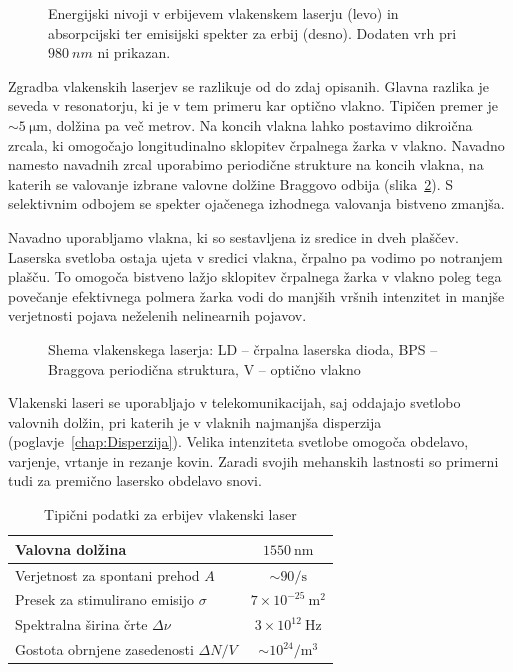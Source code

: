 \begin{figure}[h]
\centering
\def\svgwidth{130truemm} 

\caption{Energijski nivoji v erbijevem vlakenskem laserju (levo) in 
absorpcijski ter emisijski spekter za erbij (desno). Dodaten vrh pri $980~\si{nm}$ 
ni prikazan.}
\label{fig:ErFib}
\end{figure} 

Zgradba vlakenskih laserjev se razlikuje od do zdaj opisanih. Glavna razlika je
seveda v resonatorju, ki je v tem primeru kar optično vlakno. Tipičen premer je 
$\sim 5~\si{\micro\meter}$, dolžina pa več metrov. Na koncih vlakna lahko 
postavimo dikroična zrcala, ki omogočajo longitudinalno sklopitev črpalnega 
žarka v vlakno. Navadno namesto navadnih zrcal uporabimo periodične strukture 
na koncih vlakna, na katerih se valovanje izbrane valovne dolžine Braggovo odbija
(slika~\ref{fig:Fibshema}). 
S selektivnim odbojem se spekter ojačenega izhodnega valovanja bistveno zmanjša. 

Navadno uporabljamo vlakna, ki so sestavljena iz sredice in dveh plaščev. Laserska
svetloba ostaja ujeta v sredici vlakna, črpalno pa vodimo po notranjem plašču. To
omogoča bistveno lažjo sklopitev črpalnega žarka v vlakno poleg tega povečanje
efektivnega polmera žarka vodi do manjših vršnih intenzitet in manjše verjetnosti
pojava neželenih nelinearnih pojavov. 

\begin{figure}[h]
\centering
\def\svgwidth{100truemm} 

\caption{Shema vlakenskega laserja: LD -- črpalna laserska dioda, 
BPS -- Braggova periodična struktura, V -- optično vlakno
}
\label{fig:Fibshema}
\end{figure}

Vlakenski laseri se uporabljajo v telekomunikacijah, saj oddajajo svetlobo 
valovnih dolžin, pri katerih je v vlaknih najmanjša disperzija (poglavje~\ref{chap:Disperzija}). 
Velika intenziteta svetlobe omogoča obdelavo, varjenje, vrtanje in rezanje kovin. 
Zaradi svojih mehanskih lastnosti so primerni tudi za premično lasersko obdelavo snovi.

\begin{table}[!h]
\begin{center}
\begin{tabular}{|l|c|}\hline
Valovna dolžina  & $1550~\si{\nano\meter}$\\ \hline
Verjetnost za spontani prehod $A$ & $ \sim 90/\si{\second}$ \\ \hline
Presek za stimulirano emisijo $\sigma$ & $7 \times 10^{-25}~\si{\metre}^2$ \\ \hline
Spektralna širina črte $\Delta \nu$ & $3 \times 10^{12}~\si{\hertz}$  \\ \hline
Gostota obrnjene zasedenosti $\Delta N/V$ & $ \sim 10^{24}/\si{\metre}^3$ \\ \hline
\end{tabular}
\caption{Tipični podatki za erbijev vlakenski laser}
\label{tab:fib}
\end{center}
\end{table}

